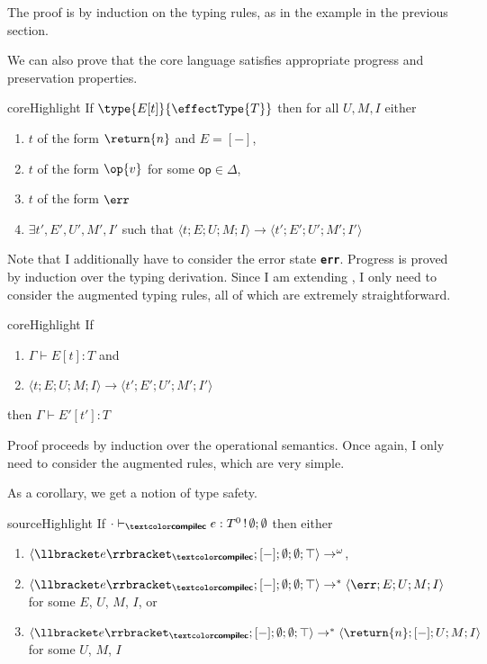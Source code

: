 The proof is by induction on the typing rules, as in the example in the previous section.  

We can also prove that the core language \coreLang{} satisfies appropriate progress and preservation properties. 

\begin{theorem}[Progress]{coreHighlight} 
If $\type{E[t]}{\effectType{T}}$ then for all $U, M, I$ either 
\begin{enumerate}
\item $t$ of the form $\return{n}$ and $E = [-]$,
\item $t$ of the form $\op{v}$ for some $\textsf{op} \in \Delta$,
\item $t$ of the form $\err$
\item $\exists t', E', U', M', I'$ such that $\langle t; E; U; M; I \rangle \rightarrow \langle t';E';U';M';I'\rangle$
\end{enumerate}
\end{theorem}
Note that I additionally have to consider the error state \textbf{\texttt{err}}. Progress is proved by induction over the typing derivation. Since I am extending \efflang{}, I only need to consider the augmented typing rules, all of which are extremely straightforward.

\begin{theorem}{coreHighlight}
If 
\begin{enumerate} 
  \item $\Gamma \vdash E[t]: T$ and 
  \item $\langle t; E; U; M; I \rangle \to \langle t'; E'; U'; M'; I' \rangle$ 
  \end{enumerate}
  then $\Gamma \vdash E'[t']: T$ 
\end{theorem}
Proof proceeds by induction over the operational semantics. Once again, I only need to consider the augmented rules, which are very simple. 

As a corollary, we get a notion of type safety.
\begin{corollary}{sourceHighlight}\label{cor:core-type-safety}
  If $\ctypejudge[\cdot]{e}{T^0 \, ! \, \emptyset;\emptyset}$ then either
  \begin{enumerate}
    \item $\langle \elaborate{e}_{\compilemode{}}; [-]; \emptyset
    ; \emptyset; \top \rangle \to^{\omega}$,
    \item $\langle \elaborate{e}_{\compilemode{}}; [-]; \emptyset; \emptyset; \top \rangle \to^{*} \langle \err; E; U; M; I \rangle$ for some $E$, $U$, $M$, $I$, or 
    \item $\langle \elaborate{e}_{\compilemode{}}; [-]; \emptyset; \emptyset; \top \rangle \to^{*} \langle \return{n}; [-]; U; M; I \rangle$ for some $U$, $M$, $I$
  \end{enumerate} 
\end{corollary}

